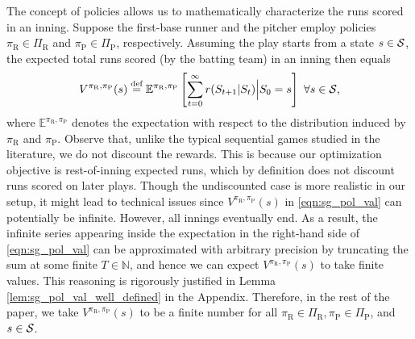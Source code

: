 \documentclass[11pt]{article}
\newcommand{\defeq}{\stackrel{\text{def}}{=}}
\begin{document}
    The concept of policies allows us to mathematically characterize the runs scored in an inning. Suppose the first-base runner and the pitcher employ policies $\pi_\text{R} \in \Pi_\text{R}$ and $\pi_\text{P} \in \Pi_\text{P}$, respectively. Assuming the play starts from a state $s \in {\cal S}$, the expected total runs scored (by the batting team) in an inning then equals 
    \begin{equation}
       \label{eqn:sg_pol_val}
       V^{\pi_\text{R},\pi_\text{P}}(s) \defeq \mathbb{E}^{\pi_\text{R},\pi_\text{P}}\left[\sum_{t=0}^\infty r(S_{t+1}|S_t) \Big| S_0 = s\right] \ \forall s \in {\cal S},
   \end{equation}
   where $\mathbb{E}^{\pi_\text{R},\pi_\text{P}}$ denotes the expectation with respect to the distribution induced by $\pi_\text{R}$ and $\pi_{\text{P}}$. Observe that, unlike the typical sequential games studied in the literature, we do not discount the rewards. This is because our optimization objective is rest-of-inning expected runs, which by definition does not discount runs scored on later plays. Though the undiscounted case is more realistic in our setup, it might lead to technical issues since $V^{\pi_\text{R},\pi_\text{P}}(s)$ in \eqref{eqn:sg_pol_val} can potentially be infinite. However, all innings eventually end. As a result, the infinite series appearing inside the expectation in the right-hand side of \eqref{eqn:sg_pol_val} can be approximated with arbitrary precision by truncating the sum at some finite $T \in \mathbb{N}$, and hence we can expect $V^{\pi_\text{R},\pi_\text{P}}(s)$ to take finite values. This reasoning is rigorously justified in Lemma \ref{lem:sg_pol_val_well_defined} in the Appendix. Therefore, in the rest of the paper, we take $V^{\pi_\text{R},\pi_\text{P}}(s)$ to be a finite number for all $\pi_\text{R} \in \Pi_\text{R}, \pi_\text{P} \in \Pi_\text{P}$, and $s \in {\cal S}$. 
   
\end{document}

